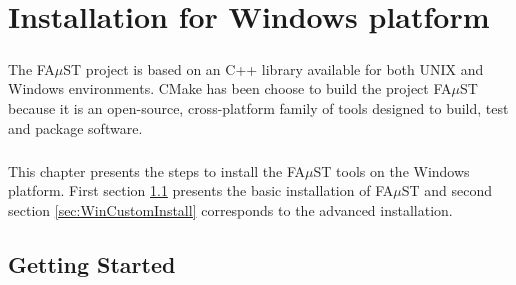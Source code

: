\chapter{Installation for Windows platform}\label{sec:WinInstall}

\paragraph{}The FA$\mu$ST project is based on an C++ library available for both UNIX and Windows environments. CMake has been choose to build the project FA$\mu$ST because it is an open-source, cross-platform family of tools designed to build, test and package software.

\paragraph{}This chapter presents the steps to install the FA$\mu$ST tools on the Windows platform. First section \ref{sec:WinGettingStarted} presents the basic installation of FA$\mu$ST and second section \ref{sec:WinCustomInstall} corresponds to the advanced  installation.


\section{Getting Started} \label{sec:WinGettingStarted}

